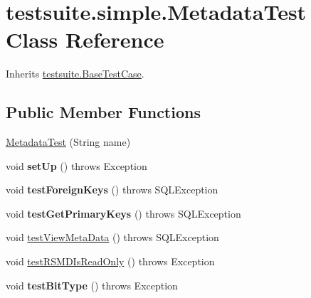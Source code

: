 \hypertarget{classtestsuite_1_1simple_1_1_metadata_test}{}\section{testsuite.\+simple.\+Metadata\+Test Class Reference}
\label{classtestsuite_1_1simple_1_1_metadata_test}


Inherits \mbox{\hyperlink{classtestsuite_1_1_base_test_case}{testsuite.\+Base\+Test\+Case}}.

\subsection*{Public Member Functions}
\begin{DoxyCompactItemize}
\item 
\mbox{\hyperlink{classtestsuite_1_1simple_1_1_metadata_test_a215f8f5f715ab9a78e98b5c48299c240}{Metadata\+Test}} (String name)
\item 
\mbox{\label{classtestsuite_1_1simple_1_1_metadata_test_ae893b849e04ac78a5f340f55afb2cb5c}} 
void {\bfseries set\+Up} ()  throws Exception 
\item 
\mbox{\label{classtestsuite_1_1simple_1_1_metadata_test_a52455a74082f9713ee3d04713e83af54}} 
void {\bfseries test\+Foreign\+Keys} ()  throws S\+Q\+L\+Exception 
\item 
\mbox{\label{classtestsuite_1_1simple_1_1_metadata_test_acfb4e086733eadeb53074eb34cf25c97}} 
void {\bfseries test\+Get\+Primary\+Keys} ()  throws S\+Q\+L\+Exception 
\item 
void \mbox{\hyperlink{classtestsuite_1_1simple_1_1_metadata_test_a57723e10153ca42cc7eac867f896d662}{test\+View\+Meta\+Data}} ()  throws S\+Q\+L\+Exception 
\item 
void \mbox{\hyperlink{classtestsuite_1_1simple_1_1_metadata_test_a64f47fc5191272bd0bcf14cf6370480b}{test\+R\+S\+M\+D\+Is\+Read\+Only}} ()  throws Exception 
\item 
\mbox{\label{classtestsuite_1_1simple_1_1_metadata_test_aa762c68b17236baad08ad296668292b7}} 
void {\bfseries test\+Bit\+Type} ()  throws Exception 
\item 

\end{DoxyCompactItemize}
